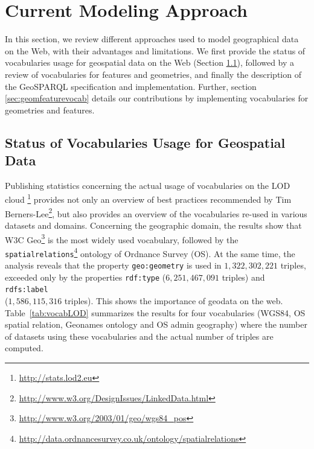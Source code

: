 \section{Current Modeling Approach}
\label{sec:currentmodel}
In this section, we review different approaches used to model geographical data on the Web, with their advantages and limitations.
We first provide the status of vocabularies usage for geospatial data on the Web (Section \ref{sec:vocgeoreview}), followed by a review of vocabularies for features and geometries, and finally the description of the GeoSPARQL specification and implementation. Further, section \ref{sec:geomfeaturevocab} details our contributions by implementing vocabularies for geometries and features. 
 
\subsection{Status of Vocabularies Usage for Geospatial Data}
\label{sec:vocgeoreview}

Publishing statistics concerning the actual usage of vocabularies on the LOD cloud \footnote{\url{http://stats.lod2.eu}} \cite{demter-2012-ekaw} provides not only an overview of best practices recommended by Tim Berners-Lee\footnote{\url{http://www.w3.org/DesignIssues/LinkedData.html}}, but also provides an overview of the vocabularies re-used in various datasets and domains. Concerning the geographic domain, the results show that W3C Geo\footnote{\url{http://www.w3.org/2003/01/geo/wgs84_pos}} is the most widely used vocabulary, followed by the \texttt{spatialrelations}\footnote{\url{http://data.ordnancesurvey.co.uk/ontology/spatialrelations}} ontology of Ordnance Survey (OS). At the same time, the analysis reveals that the property \texttt{geo:geometry} is used in $1,322,302,221$ triples, exceeded only by the properties \texttt{rdf:type} ($6,251,467,091$ triples) and \texttt{rdfs:label}\\($1,586,115,316$ triples). This shows the importance of geodata on the web. Table~\ref{tab:vocabLOD} summarizes the results for four vocabularies (WGS84, OS spatial relation, Geonames ontology and OS admin geography) where the number of datasets using these vocabularies and the actual number of triples are computed.


